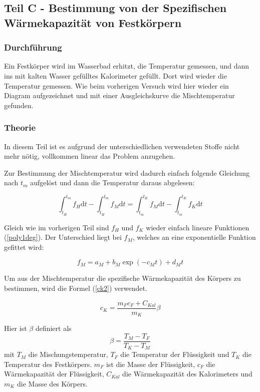 \documentclass[11pt,a4paper]{article}
\begin{document}
\pagebreak

\subsection{Teil C - Bestimmung von der Spezifischen W\"armekapazit\"at von Festk\"orpern}

\subsubsection{Durchf\"uhrung}

Ein Festk\"orper wird im Wasserbad erhitzt, die Temperatur gemessen, und dann ins mit kalten Wasser gef\"ulltes Kalorimeter gef\"ullt. Dort wird wieder die Temperatur gemessen. Wie beim vorherigen Versuch wird hier wieder ein Diagram aufgezeichnet und mit einer Ausgleichskurve die Mischtemperatur gefunden. 

\subsubsection{Theorie}

In diesem Teil ist es aufgrund der unterschiedlichen verwendeten Stoffe nicht mehr n\"otig, vollkommen linear das Problem anzugehen.

Zur Bestimmung der Mischtemperatur wird dadurch einfach folgende Gleichung nach $t_m$ aufgel\"ost und dann die Temperatur daraus abgelesen:

\begin{equation}
\int_{t_H}^{t_m}f_H\mathrm{d}t-\int_{t_H}^{t_m}f_M\mathrm{d}t=\int_{t_m}^{t_K}f_M\mathrm{d}t-\int_{t_m}^{t_K}f_K\mathrm{d}t\label{bigint2}
\end{equation}

Gleich wie im vorherigen Teil sind $f_H$ und $f_K$ wieder einfach lineare Funktionen (\ref{poly1deg}). Der Unterschied liegt bei $f_M$, welches an eine exponentielle Funktion gefittet wird:

\begin{equation}
f_M=a_M+b_M\exp({-c_Mt})+d_Mt\label{efunc1}
\end{equation}

Um aus der Mischtemperatur die spezifische W\"armekapazit\"at des K\"orpers zu bestimmen, wird die Formel (\ref{ck2}) verwendet.

\begin{equation}
c_K=\frac{m_Fc_F+C_{Kal}}{m_K}\beta\label{ck2}
\end{equation}

Hier ist $\beta$ definiert als
\[
\beta=\frac{T_M-T_F}{T_K-T_M}
\]
mit $T_M$ die Mischungstemperatur, $T_F$ die Temperatur der Fl\"ussigkeit und $T_K$ die Temperatur des Festk\"orpers. $m_F$ ist die Masse der Fl\"ussigkeit, $c_F$ die W\"armekapazit\"at der Fl\"ussigkeit, $C_{Kal}$ die W\"armekapazit\"at des Kalorimeters und $m_K$ die Masse des K\"orpers.
\end{document}
